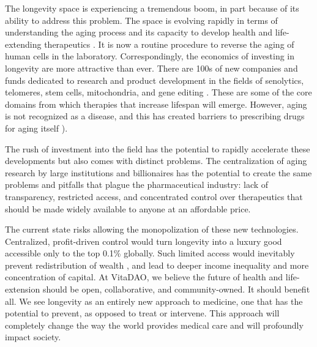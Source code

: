 \documentclass[10pt,letterpaper]{article}
\begin{document}
The longevity space is experiencing a tremendous boom, in part because of its ability to address this problem. The space is evolving rapidly in terms of understanding the aging process and its capacity to develop health and life-extending therapeutics \citep{ARDD2020}. It is now a routine procedure to reverse the aging of human cells in the laboratory. Correspondingly, the economics of investing in longevity are more attractive than ever. There are 100s of new companies and funds dedicated to research and product development in the fields of senolytics, telomeres, stem cells, mitochondria, and gene editing \citep{Pfleger2021}. These are some of the core domains from which therapies that increase lifespan will emerge. However, aging is not recognized as a disease, and this has created barriers to prescribing drugs for aging itself \citep{Suresh2014}). 

The rush of investment into the field has the potential to rapidly accelerate these developments but also comes with distinct problems. The centralization of aging research by large institutions and billionaires has the potential to create the same problems and pitfalls that plague the pharmaceutical industry: lack of transparency, restricted access, and concentrated control over therapeutics that should be made widely available to anyone at an affordable price. 

The current state risks allowing the monopolization of these new technologies. Centralized, profit-driven control would turn longevity into a luxury good accessible only to the top 0.1\% globally. Such limited access would inevitably prevent redistribution of wealth \citep{Ihle2017}, and lead to deeper income inequality and more concentration of capital. At VitaDAO, we believe the future of health and life-extension should be open, collaborative, and community-owned. It should benefit all. We see longevity as an entirely new approach to medicine, one that has the potential to prevent, as opposed to treat or intervene. This approach will completely change the way the world provides medical care and will profoundly impact society. 
\end{document}
